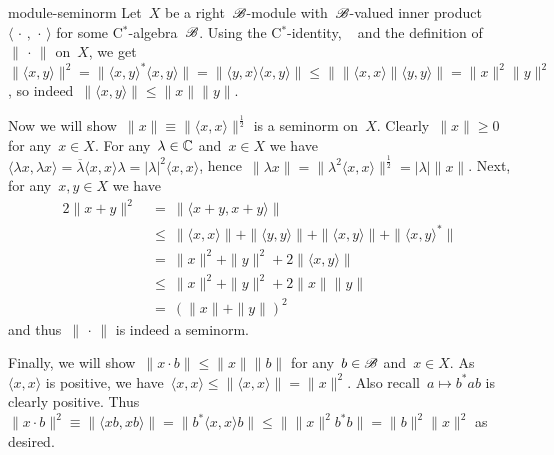 \begin{solution}{module-seminorm}%
Let~$X$ be a right~$\mathscr{B}$-module
with~$\mathscr{B}$-valued inner product~$\langle \,\cdot\,,\,\cdot\,\rangle$
    for some C$^*$-algebra~$\mathscr{B}$.
Using the C$^*$-identity, ~ and the definition
    of~$\|\,\cdot\,\|$ on~$X$, we
    get~$ \| \langle x, y\rangle\|^2
        = \| \langle x, y\rangle^* \langle x, y\rangle\|
        = \| \langle y,x \rangle\langle x,y\rangle \|
        \leq \bigl\| \|\langle x,x\rangle\| \langle y, y \rangle \bigr\|
        = \| x\|^2 \|y\|^2$,
        so indeed~$\|\langle x, y \rangle \| \leq \|x\|\|y\|$.

    Now we will show~$\|x\| \equiv \| \langle x,x\rangle\|^{\frac{1}{2}}$
    is a seminorm on~$X$.
    Clearly~$\|x\| \geq 0$ for any~$x \in X$.
For any~$\lambda \in \mathbb{C}$ and~$x \in X$
    we have~$\langle \lambda x, \lambda x \rangle
        = \overline\lambda \langle x, x \rangle \lambda
        = | \lambda |^2 \langle x,x\rangle$,
    hence~$
        \|\lambda x\|=
       \|\lambda^2 \langle x, x \rangle \|^{\frac{1}{2}} =
        |\lambda|  \|x\| $.
Next, for any~$x,y \in X$ we have
\begin{alignat*}{2}
    \| x + y \|^2 & \ = \  \| \langle x + y, x+y\rangle \| \\
    & \ \leq \ \| \langle x,x\rangle\| 
        + \| \langle y,y\rangle\|
        + \| \langle x, y \rangle \|
        + \| \langle x, y \rangle^* \| \\
    & \ = \ \|x\|^2 + \|y\|^2 + 2\|\langle x,y\rangle\| \\
    & \ \leq \ \|x\|^2 + \|y\|^2 + 2\|x\|\|y\| \\
    & \ =\ (\|x\| + \|y\|)^2
\end{alignat*}
and thus~$\|\,\cdot\,\|$ is indeed a seminorm.

Finally, we will show~$\|x \cdot b\| \leq \|x\|\|b\|$
    for any~$b\in \mathscr{B}$ and~$x \in X$.
As~$\langle x,x\rangle$ is positive,
    we have~$\langle x,x \rangle  \leq \|\langle x,x\rangle \|
            = \|x\|^2$.
Also recall~$a \mapsto b^* a b$ is clearly positive.
Thus~$\|x\cdot b\|^2 \equiv \|\langle xb, xb\rangle \|
        = \| b^* \langle x, x \rangle b\|
        \leq  \bigl\|
        \|x\|^2
        b^*b
        \bigr\|
        = \|b\|^2 \|x\|^2$ as desired.
\end{solution}

